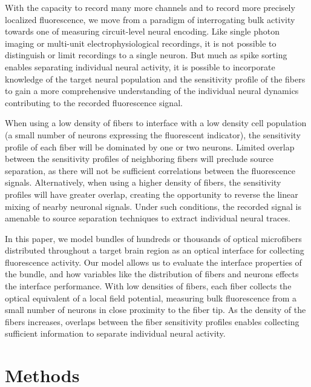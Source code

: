 With the capacity to record many more channels and to record more precisely localized fluorescence, we move from a paradigm of interrogating bulk activity towards one of measuring circuit-level neural encoding. Like single photon imaging or multi-unit electrophysiological recordings, it is not possible to distinguish or limit recordings to a single neuron. But much as spike sorting enables separating individual neural activity, it is possible to incorporate knowledge of the target neural population and the sensitivity profile of the fibers to gain a more comprehensive understanding of the individual neural dynamics contributing to the recorded fluorescence signal. 

When using a low density of fibers to interface with a low density cell population (a small number of neurons expressing the fluorescent indicator), the sensitivity profile of each fiber will be dominated by one or two neurons. Limited overlap between the sensitivity profiles of neighboring fibers will preclude source separation, as there will not be sufficient correlations between the fluorescence signals. Alternatively, when using a higher density of fibers, the sensitivity profiles will have greater overlap, creating the opportunity to reverse the linear mixing of nearby neuronal signals. Under such conditions, the recorded signal is amenable to source separation techniques to extract individual neural traces.

In this paper, we model bundles of hundreds or thousands of optical microfibers distributed throughout a target brain region as an optical interface for collecting fluorescence activity. Our model allows us to evaluate the interface properties of the bundle, and how variables like the distribution of fibers and neurons effects the interface performance. With low densities of fibers, each fiber collects the optical equivalent of a local field potential, measuring bulk fluorescence from a small number of neurons in close proximity to the fiber tip. As the density of the fibers increases, overlaps between the fiber sensitivity profiles enables collecting sufficient information to separate individual neural activity.

\section{Methods}
\label{sec:methods}


